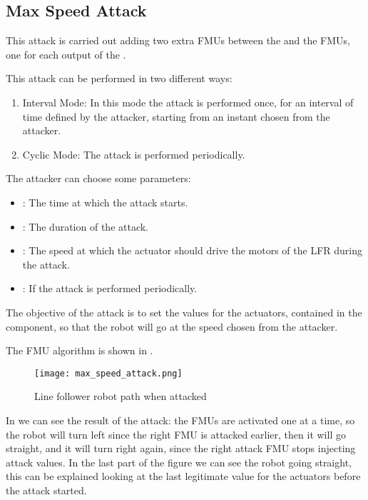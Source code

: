 \subsection{Max Speed Attack}

This attack is carried out adding two extra FMUs between the 
and the  FMUs, one for each output of the .

This attack can be performed in two different ways:

\begin{enumerate}
	\item Interval Mode: In this mode the attack is performed once, for an
		interval of time defined by the attacker, starting from an
		instant chosen from the attacker.
	\item Cyclic Mode: The attack is performed periodically.
\end{enumerate}

The attacker can choose some parameters:

\begin{itemize}
	\item {}: The time at which the attack starts.
	\item {}: The duration of the attack.
	\item {}: The speed at which the actuator should
		drive the motors of the LFR during the attack.
	\item {}: If  the attack is performed
		periodically.
\end{itemize}

The objective of the attack is to set the values for the actuators, contained in
the  component, so that the robot will go at the speed chosen from
the attacker.

The FMU algorithm is shown in .



\begin{figure}[htb]
	\centering
	\texttt{[image: max\_speed\_attack.png]}
	\caption{Line follower robot path when
	attacked}\label{fig:maxspeedresult}
\end{figure}

In  we can see the result of the attack: the FMUs are
activated one at a time, so the robot will turn left since the right FMU is
attacked earlier, then it will go straight, and it will turn right again, since
the right attack FMU stops injecting attack values. In the last part of the
figure we can see the robot going straight, this can be explained looking at the
last legitimate value for the actuators before the attack started.

